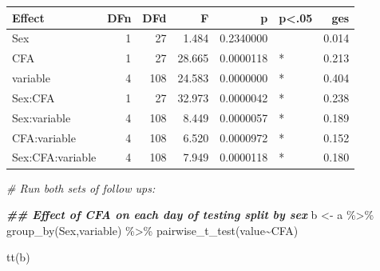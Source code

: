 \documentclass[
]{book}
\newenvironment{Shaded}{\begin{snugshade}}{\end{snugshade}}
\newcommand{\AttributeTok}[1]{\textcolor[rgb]{0.77,0.63,0.00}{#1}}
\newcommand{\CommentTok}[1]{\textcolor[rgb]{0.56,0.35,0.01}{\textit{#1}}}
\newcommand{\DocumentationTok}[1]{\textcolor[rgb]{0.56,0.35,0.01}{\textbf{\textit{#1}}}}
\newcommand{\FunctionTok}[1]{\textcolor[rgb]{0.00,0.00,0.00}{#1}}
\newcommand{\NormalTok}[1]{#1}
\newcommand{\OtherTok}[1]{\textcolor[rgb]{0.56,0.35,0.01}{#1}}
\newcommand{\SpecialCharTok}[1]{\textcolor[rgb]{0.00,0.00,0.00}{#1}}
\newcommand{\StringTok}[1]{\textcolor[rgb]{0.31,0.60,0.02}{#1}}
\begin{document}
\begin{Shaded}
\end{Shaded}

\begin{tabular}{l|r|r|r|r|l|r}
\hline
Effect & DFn & DFd & F & p & p<.05 & ges\\
\hline
Sex & 1 & 27 & 1.484 & 0.2340000 &  & 0.014\\
\hline
CFA & 1 & 27 & 28.665 & 0.0000118 & * & 0.213\\
\hline
variable & 4 & 108 & 24.583 & 0.0000000 & * & 0.404\\
\hline
Sex:CFA & 1 & 27 & 32.973 & 0.0000042 & * & 0.238\\
\hline
Sex:variable & 4 & 108 & 8.449 & 0.0000057 & * & 0.189\\
\hline
CFA:variable & 4 & 108 & 6.520 & 0.0000972 & * & 0.152\\
\hline
Sex:CFA:variable & 4 & 108 & 7.949 & 0.0000118 & * & 0.180\\
\hline
\end{tabular}

\begin{Shaded}
\begin{Highlighting}[]
\CommentTok{\# Run both sets of follow ups: }

\DocumentationTok{\#\# Effect of CFA on each day of testing split by sex}
\NormalTok{b }\OtherTok{\textless{}{-}}\NormalTok{ a }\SpecialCharTok{\%\textgreater{}\%}
  \FunctionTok{group\_by}\NormalTok{(Sex,variable) }\SpecialCharTok{\%\textgreater{}\%}
  \FunctionTok{pairwise\_t\_test}\NormalTok{(value}\SpecialCharTok{\textasciitilde{}}\NormalTok{CFA)}

\FunctionTok{tt}\NormalTok{(b)}
\end{Highlighting}
\end{Shaded}
\end{document}
